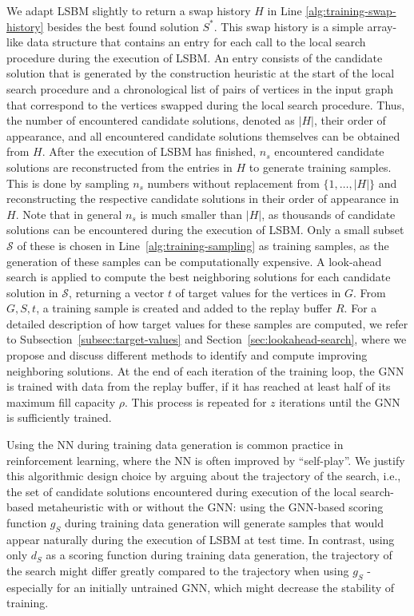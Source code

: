 \documentclass[draft,final]{vutinfth} %
\begin{document}
We adapt LSBM slightly to return a swap history $H$ in Line \ref{alg:training-swap-history} besides the best found solution $S^*$. This swap history is a simple array-like data structure that contains an entry for each call to the local search procedure during the execution of LSBM. An entry consists of the candidate solution that is generated by the construction heuristic at the start of the local search procedure and a chronological list of pairs of vertices in the input graph that correspond to the vertices swapped during the local search procedure. Thus, the number of encountered candidate solutions, denoted as $|H|$, their order of appearance, and all encountered candidate solutions themselves can be obtained from $H$. 
After the execution of LSBM has finished, $n_s$ encountered candidate solutions are reconstructed from the entries in $H$ to generate training samples. This is done by sampling $n_s$ numbers without replacement from $\{1, \dots, |H|\}$ and reconstructing the respective candidate solutions in their order of appearance in $H$. 
Note that in general $n_s$ is much smaller than $|H|$, as thousands of candidate solutions can be encountered during the execution of LSBM. Only a small subset $\mathcal{S}$ of these is chosen in Line~\ref{alg:training-sampling} as training samples, as the generation of these samples can be computationally expensive. 
A look-ahead search is applied to compute the best neighboring solutions for each candidate solution in $\mathcal{S}$, returning a vector $t$ of target values for the vertices in $G$. From $G, S, t$, a training sample is created and added to the replay buffer $R$. For a detailed description of how target values for these samples are computed, we refer to Subsection~\ref{subsec:target-values} and Section~\ref{sec:lookahead-search}, where we propose and discuss different methods to identify and compute improving neighboring solutions. 
At the end of each iteration of the training loop, the GNN is trained with data from the replay buffer, if it has reached at least half of its maximum fill capacity $\rho$. 
This process is repeated for $z$ iterations until the GNN is sufficiently trained. 

Using the NN during training data generation is common practice in reinforcement learning, where the NN is often improved by ``self-play''. 
We justify this algorithmic design choice by arguing about the trajectory of the search, i.e., the set of candidate solutions encountered during execution of the local search-based metaheuristic with or without the GNN: using the GNN-based scoring function $g_S$ during training data generation will generate samples that would appear naturally during the execution of LSBM at test time. In contrast, using only $d_S$ as a scoring function during training data generation, the trajectory of the search might differ greatly compared to the trajectory when using $g_S$ - especially for an initially untrained GNN, which might decrease the stability of training. 
\end{document}
